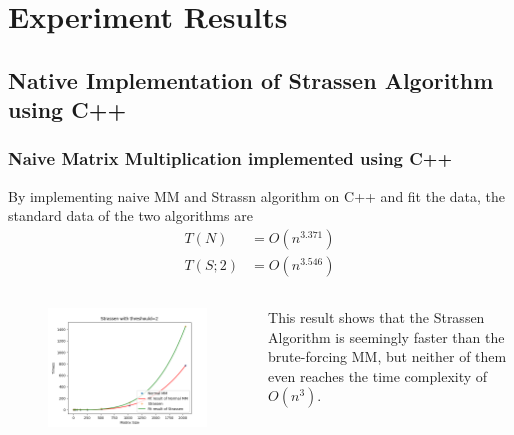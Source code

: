 \documentclass[cjk]{beamer}
\begin{document}
\section{Experiment Results}
\subsection{Native Implementation of Strassen Algorithm using C++}
\begin{frame}
  \frametitle{Naive Matrix Multiplication implemented using C++}

  By implementing naive MM and Strassn algorithm on C++ and fit the data, the standard data of the two algorithms are
  \begin{equation}
    \begin{aligned}
      T(N)   & =O(n^{3.371}) \\
      T(S;2) & =O(n^{3.546})
    \end{aligned}
  \end{equation}
  \begin{columns}
    \begin{figure}[htb]
      \includegraphics[width=0.8\linewidth]{th=2.png}
    \end{figure}
    This result shows that the Strassen Algorithm is seemingly faster than the brute-forcing MM, but neither of them even reaches the time complexity of \(O(n^3)\).
  \end{columns}
\end{frame}
\end{document}
